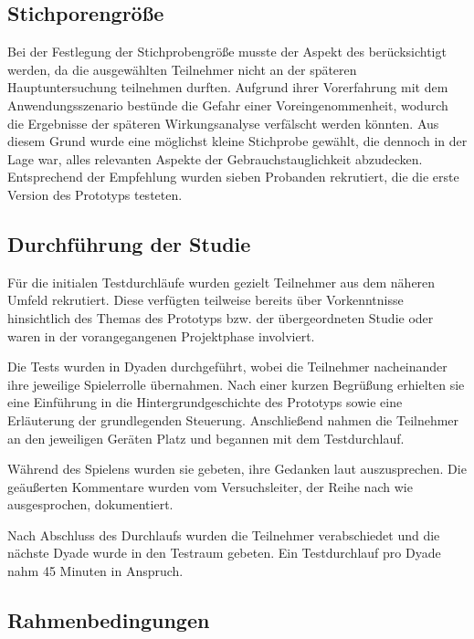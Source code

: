 \subsection{Stichporengröße}\label{sec:pre-study-sample}

Bei der Festlegung der Stichprobengröße musste der Aspekt des  berücksichtigt werden, da die ausgewählten Teilnehmer nicht an der späteren Hauptuntersuchung teilnehmen durften. Aufgrund ihrer Vorerfahrung mit dem Anwendungsszenario bestünde die Gefahr einer Voreingenommenheit, wodurch die Ergebnisse der späteren Wirkungsanalyse verfälscht werden könnten. Aus diesem Grund wurde eine möglichst kleine Stichprobe gewählt, die dennoch in der Lage war, alles relevanten Aspekte der Gebrauchstauglichkeit abzudecken. Entsprechend der Empfehlung \citet[S. 3088]{turner_determining_2006} wurden sieben Probanden rekrutiert, die die erste Version des Prototyps testeten.

\subsection{Durchführung der Studie}

Für die initialen Testdurchläufe wurden gezielt Teilnehmer aus dem näheren Umfeld rekrutiert. Diese verfügten teilweise bereits über Vorkenntnisse hinsichtlich des Themas des Prototyps bzw. der übergeordneten Studie oder waren in der vorangegangenen Projektphase involviert.

Die Tests wurden in Dyaden durchgeführt, wobei die Teilnehmer nacheinander ihre jeweilige Spielerrolle übernahmen. Nach einer kurzen Begrüßung erhielten sie eine Einführung in die Hintergrundgeschichte des Prototyps sowie eine Erläuterung der grundlegenden Steuerung. Anschließend nahmen die Teilnehmer an den jeweiligen Geräten Platz und begannen mit dem Testdurchlauf.

Während des Spielens wurden sie gebeten, ihre Gedanken laut auszusprechen. Die geäußerten Kommentare wurden vom Versuchsleiter, der Reihe nach wie ausgesprochen, dokumentiert.

Nach Abschluss des Durchlaufs wurden die Teilnehmer verabschiedet und die nächste Dyade wurde in den Testraum gebeten. Ein Testdurchlauf pro Dyade nahm 45 Minuten in Anspruch.

\subsection{Rahmenbedingungen}\label{sec:pre-study-rahmen}

